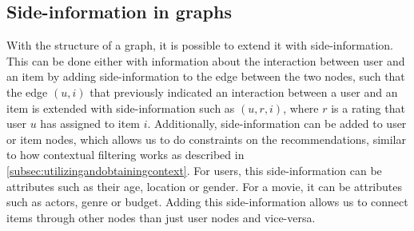 \subsection{Side-information in graphs}
With the structure of a graph, it is possible to extend it with side-information.
This can be done either with information about the interaction between user and an item by adding side-information to the edge between the two nodes, such that the edge $(u, i)$ that previously indicated an interaction between a user and an item is extended with side-information such as $(u, r, i)$, where $r$ is a rating that user $u$ has assigned to item $i$\cite{aggarwal2016recommender}. 
Additionally, side-information can be added to user or item nodes, which allows us to do constraints on the recommendations, similar to how contextual filtering works as described in \autoref{subsec:utilizingandobtainingcontext}.
For users, this side-information can be attributes such as their age, location or gender.
For a movie, it can be attributes such as actors, genre or budget.
Adding this side-information allows us to connect items through other nodes than just user nodes and vice-versa.



